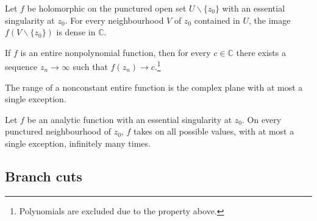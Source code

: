     \begin{theorem}
        Let $f$ be holomorphic on the punctured open set $U\backslash\{z_0\}$ with an essential singularity at $z_0$. For every neighbourhood $V$ of $z_0$ contained in $U$, the image $f(V\backslash\{z_0\})$ is dense in $\mathbb{C}$.
    \end{theorem}
    \begin{result}
        If $f$ is an entire nonpolynomial function, then for every $c\in\mathbb{C}$ there exists a sequence $z_n\longrightarrow\infty$ such that $f(z_n)\longrightarrow c$.\footnote{Polynomials are excluded due to the property above.}
    \end{result}

    \begin{theorem}
        The range of a nonconstant entire function is the complex plane with at most a single exception.
    \end{theorem}
    \begin{theorem}
        Let $f$ be an analytic function with an essential singularity at $z_0$. On every punctured neighbourhood of $z_0$, $f$ takes on all possible values, with at most a single exception, infinitely many times.
    \end{theorem}

\subsection{Branch cuts}


